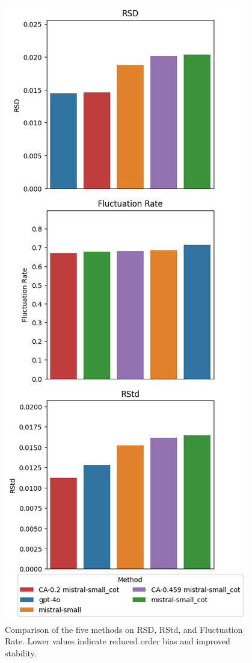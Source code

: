 \begin{figure}[t]
    \centering
    \includegraphics[height=0.63\textheight]{figures/overall.png}
    \caption{Comparison of the five methods on RSD, RStd, and Fluctuation Rate. Lower values indicate reduced order bias and improved stability.}
    \label{fig:overall_results}
\end{figure}

